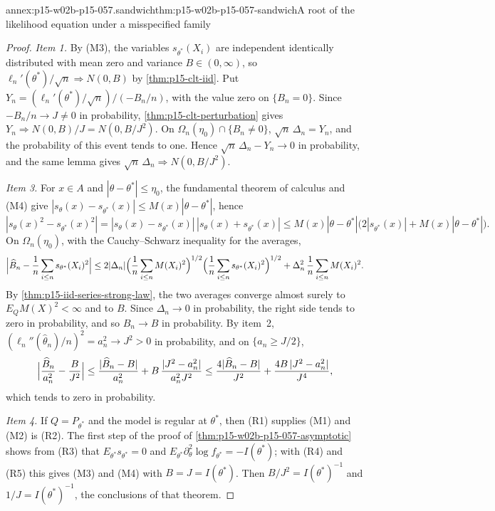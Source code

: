 \begin{annexitem}{annex:p15-w02b-p15-057.sandwich}{thm:p15-w02b-p15-057-sandwich}{A root of the likelihood equation under a misspecified family}
\begin{proof}
\emph{Item 1.} By (M3), the variables \(s_{\theta^*}(X_i)\) are
independent identically distributed with mean zero and variance
\(B\in(0,\infty)\), so \(\ell_n'(\theta^*)/\sqrt n\Rightarrow N(0,B)\) by
\cref{thm:p15-clt-iid}. Put \(Y_n=(\ell_n'(\theta^*)/\sqrt n)/(-B_n/n)\),
with the value zero on \(\{B_n=0\}\). Since \(-B_n/n\to J\neq0\) in
probability, \cref{thm:p15-clt-perturbation} gives
\(Y_n\Rightarrow N(0,B)/J=N(0,B/J^2)\). On
\(\Omega_n(\eta_0)\cap\{B_n\neq0\}\), \(\sqrt n\,\Delta_n=Y_n\), and the
probability of this event tends to one. Hence
\(\sqrt n\,\Delta_n-Y_n\to0\) in probability, and the same lemma gives
\(\sqrt n\,\Delta_n\Rightarrow N(0,B/J^2)\).

\emph{Item 3.} For \(x\in A\) and \(|\theta-\theta^*|\leq\eta_0\), the
fundamental theorem of calculus and (M4) give
\(|s_\theta(x)-s_{\theta^*}(x)|\leq M(x)|\theta-\theta^*|\), hence
\[
 |s_\theta(x)^2-s_{\theta^*}(x)^2|
 =|s_\theta(x)-s_{\theta^*}(x)|\,|s_\theta(x)+s_{\theta^*}(x)|
 \leq M(x)|\theta-\theta^*|\bigl(2|s_{\theta^*}(x)|+M(x)|\theta-\theta^*|\bigr).
\]
On \(\Omega_n(\eta_0)\), with the Cauchy--Schwarz inequality for the
averages,
\[
 \Bigl|\widehat B_n-\frac1n\sum_{i\leq n}s_{\theta^*}(X_i)^2\Bigr|
 \leq2|\Delta_n|\Bigl(\frac1n\sum_{i\leq n}M(X_i)^2\Bigr)^{1/2}
 \Bigl(\frac1n\sum_{i\leq n}s_{\theta^*}(X_i)^2\Bigr)^{1/2}
 +\Delta_n^2\,\frac1n\sum_{i\leq n}M(X_i)^2 .
\]
By \cref{thm:p15-iid-series-strong-law}, the two averages converge almost
surely to \(E_QM(X)^2<\infty\) and to \(B\). Since \(\Delta_n\to0\) in
probability, the right side tends to zero in probability, and so
\(\widehat B_n\to B\) in probability. By item~2,
\((\ell_n''(\widehat\theta_n)/n)^2=a_n^2\to J^2>0\) in probability, and
on \(\{a_n\geq J/2\}\),
\[
 \Bigl|\frac{\widehat B_n}{a_n^2}-\frac B{J^2}\Bigr|
 \leq\frac{|\widehat B_n-B|}{a_n^2}+B\,\frac{|J^2-a_n^2|}{a_n^2J^2}
 \leq\frac{4|\widehat B_n-B|}{J^2}+\frac{4B\,|J^2-a_n^2|}{J^4},
\]
which tends to zero in probability.

\emph{Item 4.} If \(Q=P_{\theta^*}\) and the model is regular at
\(\theta^*\), then (R1) supplies (M1) and (M2) is (R2). The first step of
the proof of \cref{thm:p15-w02b-p15-057-asymptotic} shows from (R3) that
\(E_{\theta^*}s_{\theta^*}=0\) and
\(E_{\theta^*}\partial_\theta^2\log f_{\theta^*}=-I(\theta^*)\); with
(R4) and (R5) this gives (M3) and (M4) with \(B=J=I(\theta^*)\). Then
\(B/J^2=I(\theta^*)^{-1}\) and \(1/J=I(\theta^*)^{-1}\), the conclusions
of that theorem.
\end{proof}
\end{annexitem}

